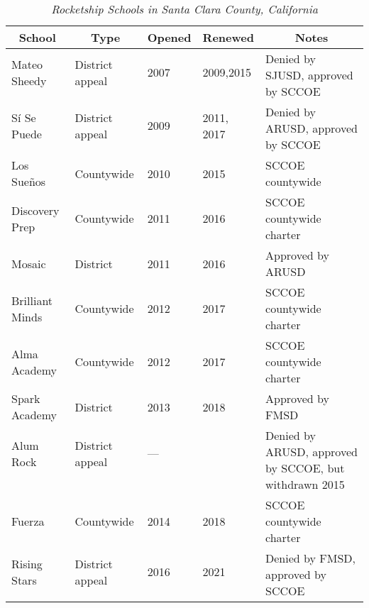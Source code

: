 \begin{table}[ht]
  \caption[Rocketship Schools in Santa Clara County, California]{\textit{Rocketship Schools in Santa Clara County, California}}%
  \label{tab:RocketshipSchools}\SingleSpacing\small
  \begin{tabular}{lllll}\toprule
    \multicolumn{1}{c}{School}  & \multicolumn{1}{c}{Type}    & \multicolumn{1}{c}{Opened}  & \multicolumn{1}{c}{Renewed} & \multicolumn{1}{c}{Notes}                \\
    \midrule
    Mateo Sheedy    & District appeal & 2007            & 2009,2015        & \multirow[t]{2}{1.5in}{Denied by SJUSD, approved by SCCOE}\\\\
    Sí Se Puede     & District appeal & 2009            & 2011, 2017       & \multirow[t]{2}{1.5in}{Denied by ARUSD, approved by SCCOE}\\\\
    Los Sueños      & Countywide      & 2010            & 2015             & SCCOE countywide\\
    Discovery Prep  & Countywide      & 2011            & 2016             & SCCOE countywide charter\\
    Mosaic          & District        & 2011            & 2016             & Approved by ARUSD\\
    Brilliant Minds & Countywide      & 2012            & 2017             & SCCOE countywide charter\\
    Alma Academy    & Countywide      & 2012            & 2017             & SCCOE countywide charter\\
    Spark Academy   & District        & 2013            & 2018             & Approved by FMSD\\
    Alum Rock       & District appeal & —               &                  & \multirow[t]{3}{1,5in}{Denied by ARUSD, approved by SCCOE, but withdrawn 2015}\\\\\\
    Fuerza          & Countywide      & 2014            & 2018             & SCCOE countywide charter\\
    Rising Stars    & District appeal & 2016            & 2021             & \multirow[t]{3}{1.5in}{Denied by FMSD, approved by SCCOE}\\\\\bottomrule
  \end{tabular}
\end{table}


